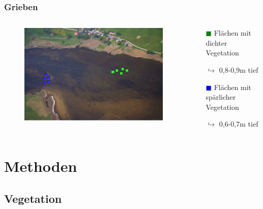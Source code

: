 \documentclass[xcolor=dvipsnames]{beamer}
\begin{document}
\begin{frame}
\frametitle{Grieben}
\begin{columns}
\begin{column}{7.5cm}
\begin{figure}
\includegraphics[width=\textwidth]{images/Fotos/griebenerbucht.png}
\end{figure}
\end{column}
\begin{column}{4cm}
\begin{itemize}
\item[\textcolor{green}{$\blacksquare$}] Flächen mit dichter Vegetation
\item[$ \hookrightarrow $] 0,8-0,9m tief
\item[]
\item[\textcolor{blue}{$\blacksquare$}] Flächen mit spärlicher Vegetation 
\item[$ \hookrightarrow $] 0,6-0,7m tief
\end{itemize}
\end{column}
\end{columns}
\end{frame}

\section{Methoden}
\subsection{Vegetation}
\end{document}
